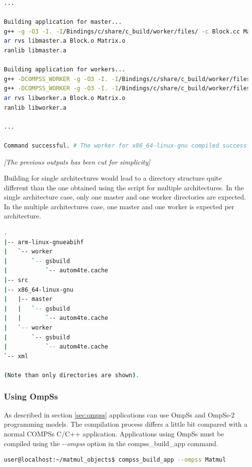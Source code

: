 \begin{lstlisting}[language=bash]
...

Building application for master...
g++ -g -O3 -I. -I/Bindings/c/share/c_build/worker/files/ -c Block.cc Matrix.cc 
ar rvs libmaster.a Block.o Matrix.o
ranlib libmaster.a

Building application for workers...
g++ -DCOMPSS_WORKER -g -O3 -I. -I/Bindings/c/share/c_build/worker/files/ -c Block.cc -o Block.o
g++ -DCOMPSS_WORKER -g -O3 -I. -I/Bindings/c/share/c_build/worker/files/ -c Matrix.cc -o Matrix.o
ar rvs libworker.a Block.o Matrix.o 
ranlib libworker.a

... 

Command successful. # The worker for x86_64-linux-gnu compiled successfuly

\end{lstlisting}

\emph{[The previous outputs has been cut for simplicity]}
\newline

Building for single architectures would lead to a directory structure quite different than the one obtained using the script for multiple architectures. In the single architecture case, only one master and one worker directories are expected. In the multiple architectures case, one master and one worker is expected per architecture.

\begin{lstlisting}[language=bash]
.
|-- arm-linux-gnueabihf
|   `-- worker
|       `-- gsbuild
|           `-- autom4te.cache
|-- src
|-- x86_64-linux-gnu
|   |-- master
|   |   `-- gsbuild
|   |       `-- autom4te.cache
|   `-- worker
|       `-- gsbuild
|           `-- autom4te.cache
`-- xml

(Note than only directories are shown).

\end{lstlisting}

\subsubsection{Using OmpSs}

As described in section \ref{sec:ompss} applications can use OmpSs and OmpSs-2 programming models. The compilation process differs a little bit compared with a normal COMPSs C/C++ application. Applications using OmpSs must be compiled using the \textit{-{}-ompss} option in the compss\_build\_app command.

\begin{lstlisting}[language=bash]
user@localhost:~/matmul_objects$ compss_build_app --ompss Matmul
\end{lstlisting}

